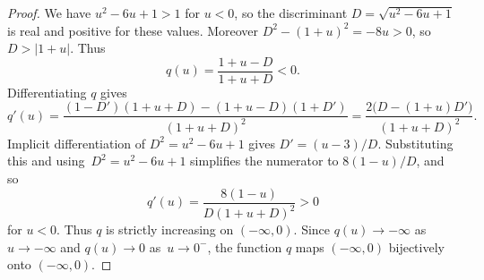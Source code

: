 \documentclass[10pt,a4paper]{amsart}
\begin{document}
\begin{proof}
We have $u^2 - 6u + 1 > 1$ for $u < 0$, so the discriminant $D = \sqrt{u^2 - 6u + 1}$ is real and positive for these values. Moreover $D^2 - (1+u)^2 = -8u > 0$, so $D > |1+u|$. Thus
\[
	q(u) = \frac{1+u-D}{1+u+D} < 0.
\]
Differentiating $q$ gives
\[
	q'(u) = \frac{(1-D')(1+u+D) - (1+u-D)(1+D')}{(1+u+D)^2} = \frac{2\bigl(D - (1+u)D'\bigr)}{(1+u+D)^2}.
\]
Implicit differentiation of $D^2 = u^2 - 6u + 1$ gives $D' = (u-3)/D$. Substituting this and using~${D^2 = u^2 - 6u + 1}$ simplifies the numerator to $8(1-u)/D$, and so
\[
	q'(u) = \frac{8(1-u)}{D(1+u+D)^2} > 0
\]
for $u < 0$.
Thus $q$ is strictly increasing on $(-\infty, 0)$. Since $q(u) \to -\infty$ as $u \to -\infty$ and $q(u) \to 0$ as~${u \to 0^-}$, the function $q$ maps $(-\infty, 0)$ bijectively onto $(-\infty, 0)$.
\end{proof}
\end{document}
